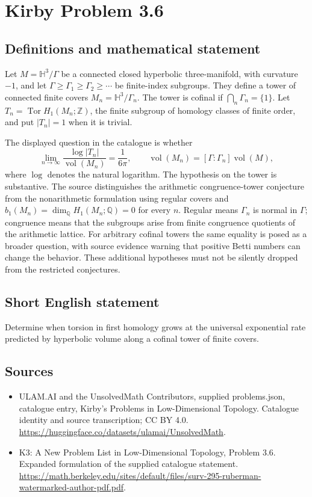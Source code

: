 \documentclass[11pt,a4paper]{article}
\begin{document}
\section*{Kirby Problem 3.6}\label{statement}

\subsection{Definitions and mathematical statement}
Let $M=\mathbb H^3/\Gamma$ be a connected closed hyperbolic three-manifold,
with curvature $-1$, and let $\Gamma\geq\Gamma_1\geq\Gamma_2\geq\cdots$
be finite-index subgroups. They define a tower of connected finite covers
$M_n=\mathbb H^3/\Gamma_n$. The tower is cofinal if
$\bigcap_n\Gamma_n=\{1\}$. Let
$T_n=\operatorname{Tor}H_1(M_n;\mathbb Z)$, the finite subgroup of homology
classes of finite order, and put $|T_n|=1$ when it is trivial.

The displayed question in the catalogue is whether
\[
 \lim_{n\to\infty}
 \frac{\log|T_n|}{\operatorname{vol}(M_n)}=\frac1{6\pi},
 \qquad
 \operatorname{vol}(M_n)=[\Gamma:\Gamma_n]\operatorname{vol}(M),
\]
where $\log$ denotes the natural logarithm. The hypothesis on the tower is
substantive. The source distinguishes the arithmetic congruence-tower
conjecture from the nonarithmetic formulation using regular covers and
$b_1(M_n)=\dim_{\mathbb Q}H_1(M_n;\mathbb Q)=0$ for every $n$.
Regular means $\Gamma_n$ is normal in $\Gamma$; congruence means that the
subgroups arise from finite congruence quotients of the arithmetic lattice.
For arbitrary cofinal towers the same equality is posed as a broader question,
with source evidence warning that positive Betti numbers can change the behavior.
These additional hypotheses must not be silently dropped from the restricted conjectures.
\subsection{Short English statement}
Determine when torsion in first homology grows at the universal exponential rate predicted by hyperbolic volume along a cofinal tower of finite covers.
\subsection{Sources}
\begin{itemize}
\item[S1] ULAM.AI and the UnsolvedMath Contributors, supplied problems.json, catalogue entry, Kirby's Problems in Low-Dimensional Topology. Catalogue identity and source transcription; CC BY 4.0.
\url{https://huggingface.co/datasets/ulamai/UnsolvedMath}.
\item[S2] K3: A New Problem List in Low-Dimensional Topology, Problem 3.6. Expanded formulation of the supplied catalogue statement.
\url{https://math.berkeley.edu/sites/default/files/surv-295-ruberman-watermarked-author-pdf.pdf}.
\end{itemize}
\end{document}
